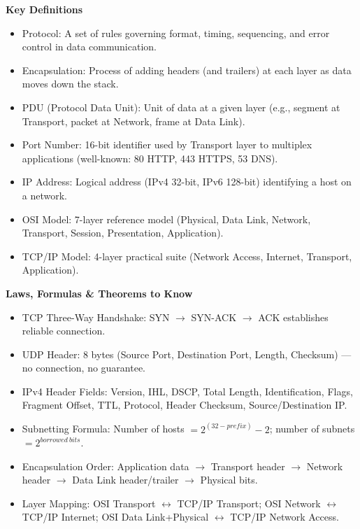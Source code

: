 \documentclass[11pt]{article}
\newcommand{\cle}[1]{{\popxbold\color{popdark}#1}}
\begin{document}
\begin{bilan}
\textbf{Key Definitions}
\begin{itemize}
\item \cle{Protocol}: A set of rules governing format, timing, sequencing, and error control in data communication.
\item \cle{Encapsulation}: Process of adding headers (and trailers) at each layer as data moves down the stack.
\item \cle{PDU (Protocol Data Unit)}: Unit of data at a given layer (e.g., segment at Transport, packet at Network, frame at Data Link).
\item \cle{Port Number}: 16-bit identifier used by Transport layer to multiplex applications (well-known: 80 HTTP, 443 HTTPS, 53 DNS).
\item \cle{IP Address}: Logical address (IPv4 32-bit, IPv6 128-bit) identifying a host on a network.
\item \cle{OSI Model}: 7-layer reference model (Physical, Data Link, Network, Transport, Session, Presentation, Application).
\item \cle{TCP/IP Model}: 4-layer practical suite (Network Access, Internet, Transport, Application).
\end{itemize}

\textbf{Laws, Formulas \& Theorems to Know}
\begin{itemize}
\item \cle{TCP Three-Way Handshake}: SYN $\rightarrow$ SYN-ACK $\rightarrow$ ACK establishes reliable connection.
\item \cle{UDP Header}: 8 bytes (Source Port, Destination Port, Length, Checksum) — no connection, no guarantee.
\item \cle{IPv4 Header Fields}: Version, IHL, DSCP, Total Length, Identification, Flags, Fragment Offset, TTL, Protocol, Header Checksum, Source/Destination IP.
\item \cle{Subnetting Formula}: Number of hosts $= 2^{(32 - prefix)} - 2$; number of subnets $= 2^{borrowed\ bits}$.
\item \cle{Encapsulation Order}: Application data $\rightarrow$ Transport header $\rightarrow$ Network header $\rightarrow$ Data Link header/trailer $\rightarrow$ Physical bits.
\item \cle{Layer Mapping}: OSI Transport $\leftrightarrow$ TCP/IP Transport; OSI Network $\leftrightarrow$ TCP/IP Internet; OSI Data Link+Physical $\leftrightarrow$ TCP/IP Network Access.
\end{itemize}


\end{bilan}
\end{document}
